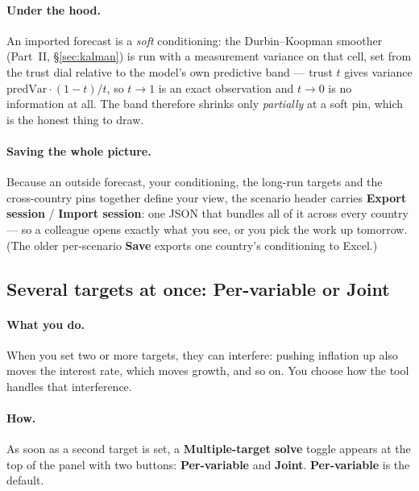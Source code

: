 \documentclass[11pt]{article}
\theoremstyle{definition}
\theoremstyle{remark}
\begin{document}
\paragraph{Under the hood.} An imported forecast is a \emph{soft} conditioning: the
Durbin--Koopman smoother (Part~II, \S\ref{sec:kalman}) is run with a measurement variance on
that cell, set from the trust dial relative to the model's own predictive band --- trust
$t$ gives variance $\mathrm{predVar}\cdot(1-t)/t$, so $t\to1$ is an exact observation and
$t\to0$ is no information at all. The band therefore shrinks only \emph{partially} at a soft
pin, which is the honest thing to draw.

\paragraph{Saving the whole picture.} Because an outside forecast, your conditioning, the
long-run targets and the cross-country pins together define your view, the scenario header
carries \textbf{Export session} / \textbf{Import session}: one JSON that bundles all of it
across every country --- so a colleague opens exactly what you see, or you pick the work up
tomorrow. (The older per-scenario \textbf{Save} exports one country's conditioning to Excel.)

\subsection{Several targets at once: Per-variable or Joint}

\paragraph{What you do.} When you set two or more targets, they can interfere: pushing
inflation up also moves the interest rate, which moves growth, and so on. You choose
how the tool handles that interference.

\paragraph{How.} As soon as a second target is set, a \textbf{Multiple-target solve}
toggle appears at the top of the panel with two buttons: \textbf{Per-variable} and
\textbf{Joint}. \textbf{Per-variable} is the default.
\end{document}
